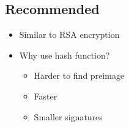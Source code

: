 
\subsection{Recommended}
\begin{itemize}
\item Similar to RSA encryption
\item Why use hash function?
  \begin{itemize}
  \item Harder to find preimage
  \item Faster
  \item Smaller signatures
  \end{itemize}
\end{itemize}
